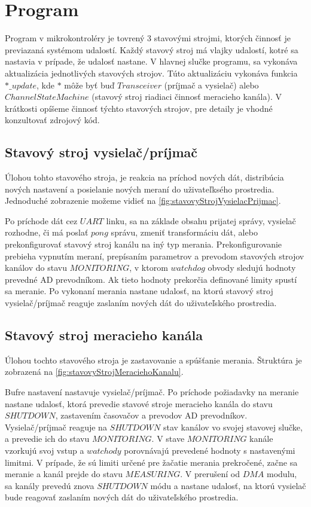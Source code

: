 \documentclass[main.tex]{subfiles}
\begin{document}
	\section{Program}
		\begin{multicols*}{2}
			\noindent Program v mikrokontroléry je tovrený 3 stavovými strojmi, ktorých činnosť je previazaná systémom udalostí. Každý stavový stroj má vlajky udalostí, kotré sa nastavia v prípade, že udalosť nastane. V hlavnej slučke programu, sa vykonáva aktualizácia jednotlivých stavových strojov. Túto aktualizáciu vykonáva funkcia $*\_update$, kde $*$ môže byť buď $Transceiver$ (príjmač a vysielač) alebo $ChannelStateMachine$ (stavový stroj riadiaci činnosť meracieho kanála). V krátkosti opíšeme činnosť týchto stavových strojov, pre detaily je vhodné konzultovať zdrojový kód.
			
			\subsection{Stavový stroj vysielač/príjmač}
			Úlohou tohto stavového stroja, je reakcia na príchod nových dát, distribúcia nových nastavení a posielanie nových meraní do uživateľksého prostredia. Jednoduché zobrazenie možeme vidieť na \cref{fig:stavovyStrojVysielacPrijmac}.
			
			
			\vskip 0.25cm
			
			\noindent Po príchode dát cez $UART$ linku, sa na základe obsahu prijatej správy, vysielač rozhodne, či má poslať $pong$ správu, zmeniť transformáciu dát, alebo prekonfigurovať stavový stroj kanálu na iný typ merania. Prekonfigurovanie prebieha vypnutím meraní, prepísaním parametrov a prevodom stavových strojov kanálov do stavu $MONITORING$, v ktorom $watchdog$ obvody sledujú hodnoty prevedné AD prevodníkom. Ak tieto hodnoty prekorčia definované limity spustí sa meranie. Po vykonaní merania nastane udalosť, na ktorú stavový stroj vysielač/príjmač reaguje zaslaním nových dát do uživateľského prostredia.
			
			\subsection{Stavový stroj meracieho kanála}
			Úlohou tochto stavového stroja je zastavovanie a spúšťanie merania. Štruktúra je zobrazená na \cref{fig:stavovyStrojMeraciehoKanalu}.
			
			
			\vskip 0.25cm
			
			\noindent Bufre nastavení nastavuje vysielač/príjmač. Po príchode požiadavky na meranie nastane udalosť, ktorá prevedie stavové stroje meracieho kanála do stavu $SHUTDOWN$, zastavením časovačov a prevodov AD prevodníkov. Vysielač/príjmač reaguje na $SHUTDOWN$ stav kanálov vo svojej stavovej slučke, a prevedie ich do stavu $MONITORING$. V stave $MONITORING$ kanále vzorkujú svoj vstup a $watchody$ porovnávajú prevedené hodnoty s nastavenými limitmi. V prípade, že sú limiti určené pre žačatie merania prekročené, začne sa meranie a kanál prejde do stavu $MEASURING$. V prerušení od $DMA$ modulu, sa kanály prevedú znova $SHUTDOWN$ módu a nastane udalosť, na ktorú vysielač bude reagovať zaslaním nových dát do uživateľského prostredia.
			
			
		\end{multicols*}
\end{document}
